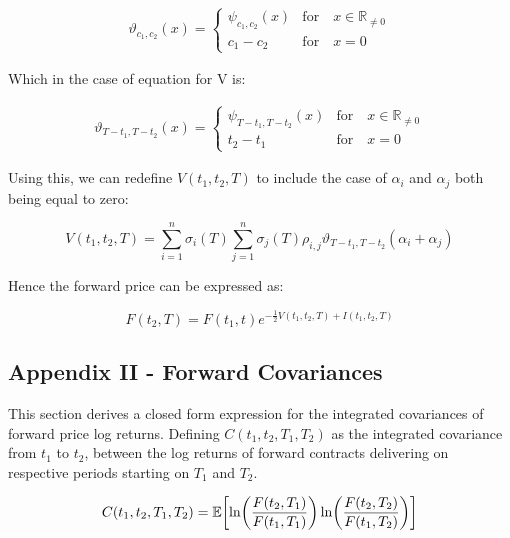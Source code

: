 \documentclass{article}
\begin{document}
\begin{align}
    \vartheta_{c_1, c_2}(x) = 
    \begin{cases}
        \psi_{c_1, c_2}(x) & \text{for} \quad x \in \mathbb{R}_{\ne 0} \\
        c_1 - c_2 & \text{for} \quad x=0
    \end{cases}
\end{align}

Which in the case of equation for V is:

\begin{align}
    \vartheta_{T-t_1, T-t_2}(x) = 
    \begin{cases}
        \psi_{T-t_1, T-t_2}(x) & \text{for} \quad x \in \mathbb{R}_{\ne 0} \\
        t_2 - t_1 & \text{for} \quad x=0
    \end{cases}
\end{align}


\bigskip

Using this, we can redefine $V(t_1, t_2, T)$ to include the case of $\alpha_i$ and
$\alpha_j$ both being equal to zero:

\begin{equation}
    \nonumber
    V(t_1, t_2, T) = \sum_{i=1}^n \sigma_i(T) \sum_{j=1}^n \sigma_j(T) \rho_{i,j} 
    \vartheta_{T-t_1, T-t_2}(\alpha_i + \alpha_j)
\end{equation}

Hence the forward price can be expressed as:

\begin{equation}
    F(t_2, T) = F(t_1, t)e^{- \frac{1}{2} V(t_1, t_2, T) + I(t_1, t_2, T)}
\end{equation}

\subsection{Appendix II - Forward Covariances}
This section derives a closed form expression for the integrated covariances of
forward price log returns. Defining $C(t_1, t_2, T_1, T_2)$
as the integrated covariance from $t_1$ to $t_2$, between the log returns of forward 
contracts delivering on respective periods starting on $T_1$ and $T_2$.

\begin{equation}
    C(t_1, t_2, T_1, T_2) = \mathbb{E}\biggl[\ln\biggl(\frac{F(t_2, T_1)}{F(t_1, T_1)} \biggr) 
    \ln\biggl(\frac{F(t_2, T_2)}{F(t_1, T_2)} \biggr) \biggr] \\
\end{equation}
\end{document}
